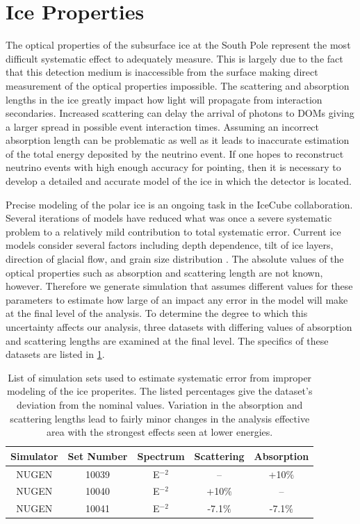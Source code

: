 \documentclass{gatech-thesis}
\begin{document}
\section{Ice Properties}
The optical properties of the subsurface ice at the South Pole represent the most difficult systematic effect to adequately measure. This is largely due to the fact that this detection medium is inaccessible from the surface making direct measurement of the optical properties impossible. The scattering and absorption lengths in the ice greatly impact how light will propagate from interaction secondaries. Increased scattering can delay the arrival of photons to DOMs giving a larger spread in possible event interaction times. Assuming an incorrect absorption length can be problematic as well as it leads to inaccurate estimation of the total energy deposited by the neutrino event. If one hopes to reconstruct neutrino events with high enough accuracy for pointing, then it is necessary to develop a detailed and accurate model of the ice in which the detector is located.

Precise modeling of the polar ice is an ongoing task in the IceCube collaboration. Several iterations of models have reduced what was once a severe systematic problem to a relatively mild contribution to total systematic error. Current ice models consider several factors including depth dependence, tilt of ice layers, direction of glacial flow, and grain size distribution \cite{2013arXiv1301.5361I}. The absolute values of the optical properties such as absorption and scattering length are not known, however. Therefore we generate simulation that assumes different values for these parameters to estimate how large of an impact any error in the model will make at the final level of the analysis. To determine the degree to which this uncertainty affects our analysis, three datasets with differing values of absorption and scattering lengths are examined at the final level. The specifics of these datasets are listed in \ref{tab:ice_sets}.

\begin{table}[h]
\caption[Ice Properties Systematic Datasets]{List of simulation sets used to estimate systematic error from improper modeling of the ice properites. The listed percentages give the dataset's deviation from the nominal values. Variation in the absorption and scattering lengths lead to fairly minor changes in the analysis effective area with the strongest effects seen at lower energies.\label{tab:ice_sets}}
\begin{center}
\begin{tabular}{ccccc}
\toprule
\textbf{Simulator} & \textbf{Set Number} &\textbf{Spectrum} & \textbf{Scattering} & \textbf{Absorption}\\
\midrule
NUGEN & 10039 & E$^{-2}$ & -- & +10$\%$ \\
NUGEN & 10040 & E$^{-2}$ & +10$\%$ & -- \\
NUGEN & 10041 & E$^{-2}$ & -7.1$\%$ & -7.1$\%$ \\
\hline
\end{tabular}
\end{center}
\end{table}
\end{document}
